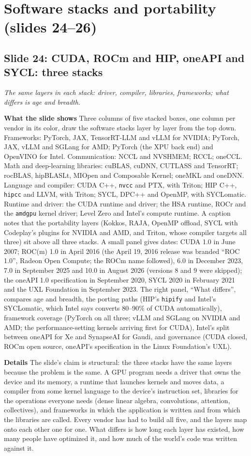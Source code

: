 \documentclass[11pt,letterpaper]{article}
\newcommand{\setstage}[1]{\colorlet{stagec}{#1}}
\newcommand{\slide}[3]{%
  \subsection[Slide #1: #2]{Slide #1: #2}%
  {\color{muted}\itshape #3\par}\medskip}
\newcommand{\para}[1]{\medskip\noindent\textbf{#1}\quad}
\begin{document}
\setstage{trn}
\section{Software stacks and portability (slides 24--26)}

\slide{24}{CUDA, ROCm and HIP, oneAPI and SYCL: three stacks}{The same layers in each stack: driver, compiler, libraries, frameworks; what differs is age and breadth.}

\para{What the slide shows} Three columns of five stacked boxes, one column per vendor in its color, draw the software stacks layer by layer from the top down. Frameworks: PyTorch, JAX, TensorRT-LLM and vLLM for NVIDIA; PyTorch, JAX, vLLM and SGLang for AMD; PyTorch (the XPU back end) and OpenVINO for Intel. Communication: NCCL and NVSHMEM; RCCL; oneCCL. Math and deep-learning libraries: cuBLAS, cuDNN, CUTLASS and TensorRT; rocBLAS, hipBLASLt, MIOpen and Composable Kernel; oneMKL and oneDNN. Language and compiler: CUDA C++, \texttt{nvcc} and PTX, with Triton; HIP C++, \texttt{hipcc} and LLVM, with Triton; SYCL, DPC++ and OpenMP, with SYCLomatic. Runtime and driver: the CUDA runtime and driver; the HSA runtime, ROCr and the \texttt{amdgpu} kernel driver; Level Zero and Intel's compute runtime. A caption notes that the portability layers (Kokkos, RAJA, OpenMP offload, SYCL with Codeplay's plugins for NVIDIA and AMD, and Triton, whose compiler targets all three) sit above all three stacks. A small panel gives dates: CUDA 1.0 in June 2007; ROC(m) 1.0 in April 2016 (the April 19, 2016 release was branded ``ROC 1.0'', Radeon Open Compute; the ROCm name followed), 6.0 in December 2023, 7.0 in September 2025 and 10.0 in August 2026 (versions 8 and 9 were skipped); the oneAPI 1.0 specification in September 2020, SYCL 2020 in February 2021 and the UXL Foundation in September 2023. The right panel, ``What differs'', compares age and breadth, the porting paths (HIP's \texttt{hipify} and Intel's SYCLomatic, which Intel says converts 80--90\% of CUDA automatically), framework coverage (PyTorch on all three; vLLM and SGLang on NVIDIA and AMD; the performance-setting kernels arriving first for CUDA), Intel's split between oneAPI for Xe and SynapseAI for Gaudi, and governance (CUDA closed, ROCm open source, oneAPI's specification in the Linux Foundation's UXL).

\para{Details} The slide's claim is structural: the three stacks have the same layers because the problem is the same. A GPU program needs a driver that owns the device and its memory, a runtime that launches kernels and moves data, a compiler from some kernel language to the device's instruction set, libraries for the operations everyone needs (dense linear algebra, convolutions, attention, collectives), and frameworks in which the application is written and from which the libraries are called. Every vendor has had to build all five, and the layers map onto each other one for one. What differs is how long each layer has existed, how many people have optimized it, and how much of the world's code was written against it.
\end{document}
